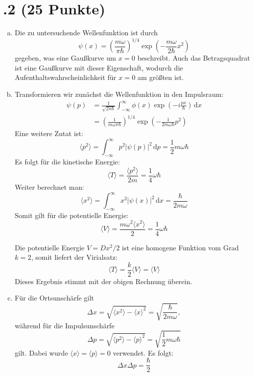 \section*{\nr.2 \tittwo (25 Punkte)}
\begin{enumerate}[(a)]
\item Die zu untersuchende Wellenfunktion ist durch
\begin{equation}
\psi(x) = \left(\frac{m\omega}{\pi\hbar}\right)^{1/4} \exp\left(-\frac{m\omega}{2\hbar}x^2 \right)
\end{equation}
gegeben, was eine Gaußkurve um $x=0$ beschreibt. Auch das Betragsquadrat ist eine Gaußkurve mit dieser Eigenschaft, wodurch die Aufenthaltswahrscheinlichkeit für $x=0$ am größten ist.
\item
Transformieren wir zunächst die Wellenfunktion in den Impulsraum:
\begin{align}
\psi(p) &= \frac{1}{\sqrt{2\pi\hbar}}\int_{-\infty}^{\infty} {\phi(x)\exp\left(-i\frac{px}{\hbar} \right)\,\mathrm{d}x}\\
 &= \left(\frac{1}{m\omega\pi\hbar}\right)^{1/4} \exp\left(-\frac{1}{2m\omega\hbar}p^2 \right)
\end{align}
Eine weitere Zutat ist:
\begin{equation}
\langle p^2\rangle = \int_{-\infty}^{\infty} {p^2\left|\psi(p)\right|^2\,\mathrm{d}p} 
= \frac{1}{2}m\omega\hbar
\end{equation}
Es folgt für die kinetische Energie:
\begin{equation}
\langle T \rangle = \frac{\langle p^2\rangle}{2m} = \frac{1}{4} \omega \hbar
\end{equation}
Weiter berechnet man:
\begin{equation}
\langle x^2\rangle = \int_{-\infty}^{\infty} {x^2\left|\psi(x)\right|^2\,\mathrm{d}x} 
= \frac{\hbar}{2m\omega}
\end{equation}
Somit gilt für die potentielle Energie:
\begin{equation}
\langle V \rangle = \frac{m\omega^2\langle x^2\rangle}{2} = \frac{1}{4} \omega \hbar
\end{equation}

Die potentielle Energie $V=Dx^2/2$ ist eine homogene Funktion vom Grad $k=2$, somit liefert der Virialsatz:
\begin{equation}
\langle T \rangle = \frac{k}{2}\langle V \rangle = \langle V \rangle
\end{equation}
Dieses Ergebnis stimmt mit der obigen Rechnung überein.
\item Für die Ortsunschärfe gilt
\begin{equation}
\Delta x = \sqrt{\langle x^2 \rangle - \langle x \rangle^2} = \sqrt{ \frac{\hbar}{2m\omega}},
\end{equation}
während für die Impulsunschärfe
\begin{equation}
\Delta p = \sqrt{\langle p^2 \rangle - \langle p \rangle^2} = \sqrt{\frac{1}{2}m\omega\hbar}
\end{equation}
gilt. Dabei wurde $\langle x \rangle = \langle p \rangle = 0$ verwendet.
Es folgt:
\begin{equation}
\Delta x \Delta p = \frac{\hbar}{2}
\end{equation}
\end{enumerate}